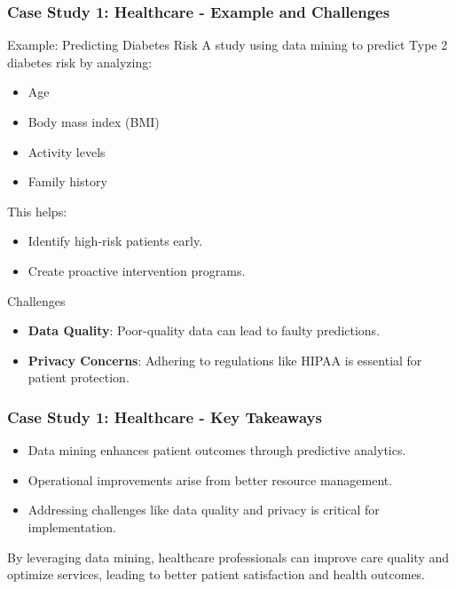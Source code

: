 \documentclass[aspectratio=169]{beamer}
\begin{document}
\begin{frame}[fragile]
    \frametitle{Case Study 1: Healthcare - Example and Challenges}
    \begin{block}{Example: Predicting Diabetes Risk}
        A study using data mining to predict Type 2 diabetes risk by analyzing:
        \begin{itemize}
            \item Age
            \item Body mass index (BMI)
            \item Activity levels
            \item Family history
        \end{itemize}
        This helps:
        \begin{itemize}
            \item Identify high-risk patients early.
            \item Create proactive intervention programs.
        \end{itemize}
    \end{block}
    
    \begin{block}{Challenges}
        \begin{itemize}
            \item \textbf{Data Quality}: Poor-quality data can lead to faulty predictions.
            \item \textbf{Privacy Concerns}: Adhering to regulations like HIPAA is essential for patient protection.
        \end{itemize}
    \end{block}
\end{frame}

\begin{frame}[fragile]
    \frametitle{Case Study 1: Healthcare - Key Takeaways}
    \begin{itemize}
        \item Data mining enhances patient outcomes through predictive analytics.
        \item Operational improvements arise from better resource management.
        \item Addressing challenges like data quality and privacy is critical for implementation.
    \end{itemize}
    
    By leveraging data mining, healthcare professionals can improve care quality and optimize services, leading to better patient satisfaction and health outcomes.
\end{frame}
\end{document}
